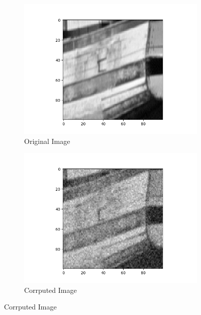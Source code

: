 \documentclass{article}
\begin{document}
  \newpage
  \begin{center}
    \begin{figure}[!htb]
      \begin{center}
        \begin{subfigure}[b]{0.5\textwidth}
          \includegraphics[width=\textwidth]{../report_images/boat_plot.png}
          \caption{Original Image}
        \end{subfigure}
        \hfill
        \begin{subfigure}[b]{0.5\textwidth}
          \includegraphics[width=\textwidth]{../report_images/noisy_boat_plot.png}
          \caption{Corrputed Image}
        \end{subfigure}

\end{center}
\end{figure}
\end{center}
\end{document}
